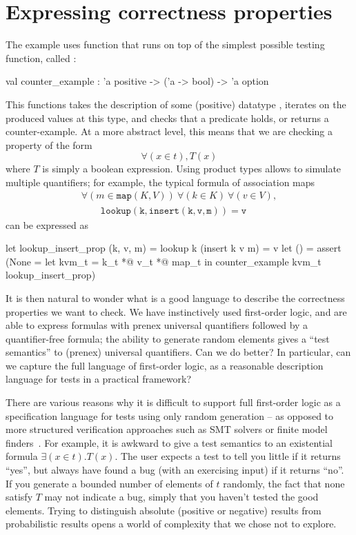 \section{Expressing correctness properties}

The  example uses  function that runs on top
of the simplest possible testing function, called
:
%
\begin{ocamlcode}
  val counter_example :
    'a positive -> ('a -> bool) -> 'a option
\end{ocamlcode}
%
This functions takes the description of some (positive) datatype
, iterates on the produced values at this type, and checks
that a predicate  holds, or returns
a counter-example. At a more abstract level, this means that we are
checking a property of the form \[ \forall (x \in t), T(x) \] where
$T$ is simply a boolean expression. Using product types allows to
simulate multiple quantifiers; for example, the typical formula of
association maps
%
\[\begin{array}{l}
  \forall (m \in \mathtt{map}(K,V))\ \forall (k \in K)\ \forall (v \in V),\\
  \qquad \mathtt{lookup(k,insert(k,v,m)) = v}
\end{array}\]
%
can be expressed as
%
\begin{ocamlcode}
  let lookup_insert_prop (k, v, m) =
    lookup k (insert k v m) = v
  let () = assert (None =
    let kvm_t = k_t *@ v_t *@ map_t in
    counter_example kvm_t lookup_insert_prop)
\end{ocamlcode}

It is then natural to wonder what is a good language to describe the
correctness properties we want to check. We have instinctively used
first-order logic, and are able to express formulas with prenex
universal quantifiers followed by a quantifier-free formula; the
ability to generate random elements gives a ``test semantics'' to
(prenex) universal quantifiers. Can we do better? In particular, can
we capture the full language of first-order logic, as a reasonable
description language for tests in a practical framework?

There are various reasons why it is difficult to support full
first-order logic as a specification language for tests using only
random generation -- as opposed to more structured verification
approaches such as SMT solvers or finite model
finders~\cite{nitpick}. For example, it is awkward to give a test
semantics to an existential formula $\exists(x \in t). T(x)$. The user
expects a test to tell you little if it returns ``yes'', but always
have found a bug (with an exercising input) if it returns ``no''. If
you generate a bounded number of elements of $t$ randomly, the fact
that none satisfy $T$ may not indicate a bug, simply that you haven't
tested the good elements. Trying to distinguish absolute (positive or
negative) results from probabilistic results opens a world of
complexity that we chose not to explore.


